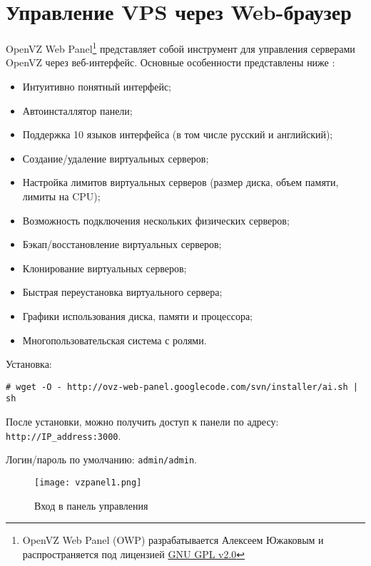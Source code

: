 \section{Управление VPS через Web-браузер}

OpenVZ Web Panel\footnote{OpenVZ Web Panel (OWP) разрабатывается Алексеем Южаковым и распространяется под лицензией \href{http://www.gnu.org/licenses/gpl-2.0.html}{GNU GPL v2.0}}
представляет собой инструмент для управления серверами OpenVZ через веб-интерфейс. 
Основные особенности представлены ниже \cite{vzpanel}:
\begin{itemize}
    \item Интуитивно понятный интерфейс;
    \item Автоинсталлятор панели;
    \item Поддержка 10 языков интерфейса (в том числе русский и английский);
    \item Создание/удаление виртуальных серверов;
    \item Настройка лимитов виртуальных серверов (размер диска, объем памяти, лимиты на CPU);
    \item Возможность подключения нескольких физических серверов;
    \item Бэкап/восстановление виртуальных серверов;
    \item Клонирование виртуальных серверов;
    \item Быстрая переустановка виртуального сервера;
    \item Графики использования диска, памяти и процессора;
    \item Многопользовательская система с ролями.
\end{itemize}

Установка:
\begin{lstlisting}
# wget -O - http://ovz-web-panel.googlecode.com/svn/installer/ai.sh | sh
\end{lstlisting}

После установки, можно получить доступ к панели по адресу: \\
\texttt{http://IP\_address:3000}.

Логин/пароль по умолчанию: \texttt{admin/admin}.

\begin{figure}[ht]
	\begin{center}
	 	\texttt{[image: vzpanel1.png]}
	 	\caption{Вход в панель управления}\label{pic:vzpanel1}
	 \end{center}
\end{figure}

